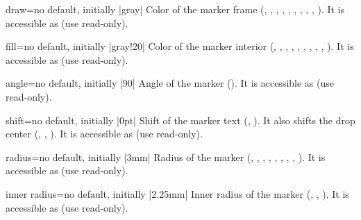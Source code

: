 \begin{docMrcKey}[marker]{draw}{=}{no default, initially |gray|}
  Color of the marker frame
  (, , , ,
    , , , ,
    , ).
  It is accessible as  (use read-only).
\end{docMrcKey}

\begin{docMrcKey}[marker]{fill}{=}{no default, initially |gray!20|}
  Color of the marker interior
  (, , , ,
    , , , ,
    , ).
  It is accessible as  (use read-only).
\end{docMrcKey}

\begin{docMrcKey}[marker]{angle}{=}{no default, initially |90|}
  Angle of the marker ().
  It is accessible as  (use read-only).
\end{docMrcKey}

\begin{docMrcKey}[marker]{shift}{=}{no default, initially |0pt|}
  Shift of the marker text
  (, ).
  It also shifts the drop center
  (, , ).
  It is accessible as  (use read-only).
\end{docMrcKey}

\clearpage

\begin{docMrcKey}[marker]{radius}{=}{no default, initially |3mm|}
  Radius of the marker
  (, , ,
    , , , ,
    , ).
  It is accessible as  (use read-only).
\end{docMrcKey}

\begin{docMrcKey}[marker]{inner radius}{=}{no default, initially |2.25mm|}
  Inner radius of the marker
  (, , ).
  It is accessible as  (use read-only).
\end{docMrcKey}

